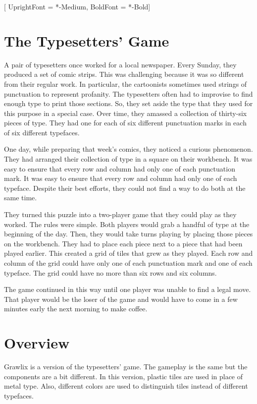 \documentclass[a4paper, 10pt, notumble]{leaflet}
\begin{document}
\newpage
\setmainfont{Quicksand}[
	UprightFont = *-Medium,
	BoldFont = *-Bold]
\raggedright
\section{The Typesetters' Game}
A pair of typesetters once worked for a local newspaper. Every Sunday, they produced a set of comic strips. This was challenging because it was so different from their regular work. In particular, the cartoonists sometimes used strings of punctuation to represent profanity. The typesetters often had to improvise to find enough type to print those sections. So, they set aside the type that they used for this purpose in a special case. Over time, they amassed a collection of thirty-six pieces of type. They had one for each of six different punctuation marks in each of six different typefaces.

One day, while preparing that week's comics, they noticed a curious phenomenon. They had arranged their collection of type in a square on their workbench. It was easy to ensure that every row and column had only one of each punctuation mark. It was easy to ensure that every row and column had only one of each typeface. Despite their best efforts, they could not find a way to do both at the same time.

They turned this puzzle into a two-player game that they could play as they worked. The rules were simple. Both players would grab a handful of type at the beginning of the day. Then, they would take turns playing by placing those pieces on the workbench. They had to place each piece next to a piece that had been played earlier. This created a grid of tiles that grew as they played. Each row and column of the grid could have only one of each punctuation mark and one of each typeface. The grid could have no more than six rows and six columns.

The game continued in this way until one player was unable to find a legal move. That player would be the loser of the game and would have to come in a few minutes early the next morning to make coffee.

\newpage

\section{Overview}
Grawlix is a version of the typesetters' game. The gameplay is the same but the components are a bit different. In this version, plastic tiles are used in place of metal type. Also, different colors are used to distinguish tiles instead of different typefaces.
\end{document}
